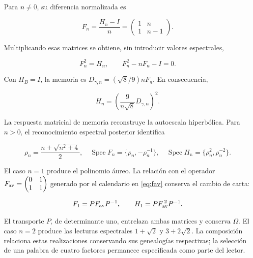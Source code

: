 Para \(n\ne0\), su diferencia normalizada es



\[
F_n=\frac{H_n-I}{n}
=\begin{pmatrix}1&n\\1&n-1\end{pmatrix}.
\]



Multiplicando esas matrices se obtiene, sin introducir valores espectrales,



\begin{equation}
\boxed{F_n^2=H_n,\qquad F_n^2-nF_n-I=0.}
\label{nuc11:eq:29}
\end{equation}



Con \(H_B=I\), la memoria es
\(D_{\gamma,n}=(\sqrt8/9)nF_n\).
En consecuencia,



\begin{equation}
\boxed{H_n=\left(\frac9{n\sqrt8}D_{\gamma,n}\right)^2.}
\label{nuc11:eq:30}
\end{equation}



La respuesta matricial de memoria reconstruye la autoescala
hiperbólica. Para \(n>0\), el reconocimiento espectral posterior
identifica



\begin{equation}
\rho_n=\frac{n+\sqrt{n^2+4}}2,\quad
\operatorname{Spec}F_n=\{\rho_n,-\rho_n^{-1}\},\quad
\operatorname{Spec}H_n=\{\rho_n^2,\rho_n^{-2}\}.
\label{nuc11:eq:31}
\end{equation}



El caso \(n=1\) produce el polinomio áureo.
La relación con el operador
\(F_{\rm av}=\begin{pmatrix}0&1\\1&1\end{pmatrix}\)
generado por el calendario en \eqref{eq:fav} conserva el cambio
de carta:



\begin{equation}
F_1=PF_{\rm av}P^{-1},\qquad
H_1=PF_{\rm av}^{\,2}P^{-1}.
\label{nuc11:eq:32}
\end{equation}



El transporte \(P\), de determinante uno, entrelaza ambas
matrices y conserva \(\Omega\).
El caso \(n=2\) produce las lecturas espectrales
\(1+\sqrt2\) y \(3+2\sqrt2\).
La composición relaciona estas realizaciones conservando sus
genealogías respectivas; la selección de una palabra de cuatro
factores permanece especificada como parte del lector.

